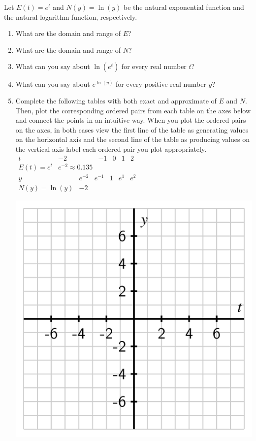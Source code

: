 \documentclass[nooutcomes]{ximera}
\begin{document}
\begin{exploration}
Let \(E(t) = e^t\) and \(N(y) = \ln(y)\) be the natural exponential function and the natural logarithm function, respectively.%

\begin{enumerate}[label=\alph*.]
\item
What are the domain and range of \(E\)?%
\item
What are the domain and range of \(N\)?%
\item
What can you say about \(\ln(e^t)\) for every real number \(t\)?%
\item
What can you say about \(e^{\ln(y)}\) for every positive real number \(y\)?%
\item
Complete the following tables with both exact and approximate of \(E\) and \(N\).  Then, plot the corresponding ordered pairs from each table on the axes below and connect the points in an intuitive way.  When you plot the ordered pairs on the axes, in both cases view the first line of the table as generating values on the horizontal axis and the second line of the table as producing values on the vertical axis label each ordered pair you plot appropriately.%
%
\\
$
\begin{array}{cccccc}
t&-2&-1&0&1&2\\
\hline
E(t)=e^t&e^{-2} \approx 0.135&&&&
\end{array}
$
\\
$
\begin{array}{cccccc}
y&e^{-2}&e^{-1}&1&e^1&e^2\\
\hline
N(y)=\ln(y)&-2&&&&
\end{array}
$
%

\includegraphics[width=1\linewidth]{images/exp-log-blank-axes.png}

\end{enumerate}
%
\end{exploration}
\end{document}
